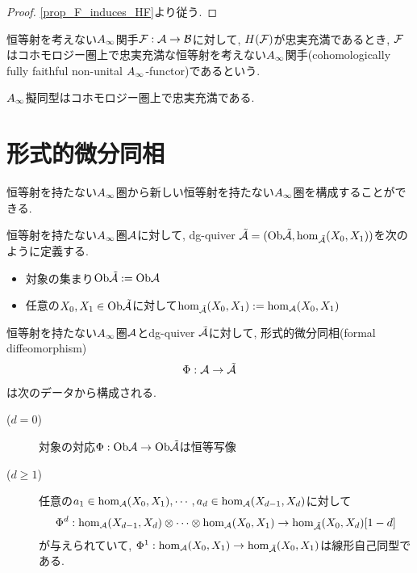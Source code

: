 \documentclass[uplatex, a4paper, 14Q, dvipdfmx]{jsarticle}
\begin{document}
\begin{proof}
  \cref{prop_F_induces_HF}より従う. 
\end{proof}

\begin{definition}
  恒等射を考えない$A_{\infty}$関手$\mathcal{F} : \mathcal{A} \to \mathcal{B}$に対して, $H(\mathcal{F})$が忠実充満であるとき, $\mathcal{F}$はコホモロジー圏上で忠実充満な恒等射を考えない$A_{\infty}$関手(cohomologically fully faithful non-unital $A_{\infty}$-functor)であるという. 
\end{definition}

\begin{example}
  $A_{\infty}$擬同型はコホモロジー圏上で忠実充満である. 
\end{example}

\section{形式的微分同相} \label{section_formal_diffeomorphism}

恒等射を持たない$A_{\infty}$圏から新しい恒等射を持たない$A_{\infty}$圏を構成することができる.

\begin{definition} \label{def_tildeA}
  恒等射を持たない$A_{\infty}$圏$\mathcal{A}$に対して, dg-quiver $\tilde{\mathcal{A}} = (\mathrm{Ob}\tilde{\mathcal{A}}, \hom_{\tilde{\mathcal{A}}}(X_0,X_1))$を次のように定義する. 
  \begin{itemize}
    \item 対象の集まり$\mathrm{Ob}\tilde{\mathcal{A}} := \mathrm{Ob}\mathcal{A}$
    \item 任意の$X_0,X_1 \in \mathrm{Ob}\tilde{\mathcal{A}}$に対して$\hom_{\tilde{\mathcal{A}}}(X_0,X_1) := \hom_{\mathcal{A}}(X_0,X_1)$
  \end{itemize} 
\end{definition}

\begin{definition}[形式的微分同相] \label{def_formal_diffeomorphism}
  恒等射を持たない$A_{\infty}$圏$\mathcal{A}$とdg-quiver $\tilde{\mathcal{A}}$に対して, 形式的微分同相(formal diffeomorphism) 
  \begin{align*}
    \Phi : \mathcal{A} \to \tilde{\mathcal{A}}
  \end{align*}
  は次のデータから構成される. 
  \begin{description}
    \item[($d=0$)] 対象の対応$\Phi : \mathrm{Ob}\mathcal{A} \to \mathrm{Ob}\tilde{\mathcal{A}}$は恒等写像
    \item[($d \geq 1$)] 任意の$a_1 \in \hom_{\mathcal{A}}(X_0,X_1), \cdots, a_d \in \hom_{\mathcal{A}}(X_{d-1},X_d)$に対して
    \begin{align*}
      \Phi^d : \hom_{\mathcal{A}}(X_{d-1},X_d) \otimes \cdots \otimes \hom_{\mathcal{A}}(X_0,X_1) \to \hom_{\tilde{\mathcal{A}}}(X_0,X_d)[1-d]
    \end{align*}
    が与えられていて, $\Phi^1 : \hom_{\mathcal{A}}(X_0,X_1) \to \hom_{\tilde{\mathcal{A}}}(X_0,X_1)$は線形自己同型である.
  \end{description}
\end{definition}
\end{document}
